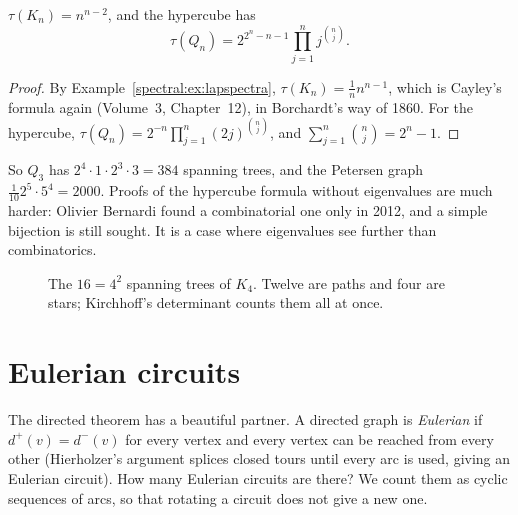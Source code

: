 \begin{corollary}\label{spectral:cor:treecounts}
$\tau(K_n)=n^{n-2}$, and the hypercube has
\[
\tau(Q_n)=2^{2^n-n-1}\prod_{j=1}^nj^{\binom nj}.
\]
\end{corollary}
\begin{proof}
By Example~\ref{spectral:ex:lapspectra}, $\tau(K_n)=\frac1nn^{n-1}$, which is Cayley's formula again (Volume~3, Chapter~12), in Borchardt's way of 1860. For the hypercube,
$\tau(Q_n)=2^{-n}\prod_{j=1}^n(2j)^{\binom nj}$, and $\sum_{j=1}^n\binom nj=2^n-1$.
\end{proof}

So $Q_3$ has $2^4\cdot1\cdot2^3\cdot3=384$ spanning trees, and the Petersen graph $\frac1{10}2^5\cdot5^4=2000$. Proofs of the hypercube formula without eigenvalues are much harder: Olivier Bernardi found a combinatorial one only in 2012, and a simple bijection is still sought.
It is a case where eigenvalues see further than combinatorics.

\begin{figure}[ht]
\centering
{}
\caption{The $16=4^2$ spanning trees of $K_4$. Twelve are paths and four are stars; Kirchhoff's determinant counts them all at once.}
\label{spectral:fig:k4trees}
\end{figure}

\section{Eulerian circuits}

The directed theorem has a beautiful partner. A directed graph is \emph{Eulerian} if $d^+(v)=d^-(v)$ for every vertex and every vertex can be reached from every
other (Hierholzer's argument splices closed tours until every arc is used, giving an Eulerian circuit). How many Eulerian circuits are there? We count them as
cyclic sequences of arcs, so that rotating a circuit does not give a new one.

